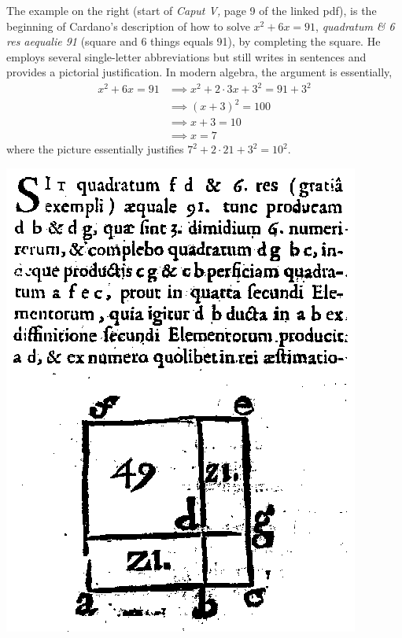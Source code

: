 \begin{minipage}[t]{0.65\linewidth}\vspace{0pt}
	The example on the right (start of \emph{Caput V,} page 9 of the linked pdf), is the beginning of Cardano's description of how to solve $x^2+6x=91$, \emph{quadratum \& 6 res aequalie 91} (square and 6 things equals 91), by completing the square. He employs several single-letter abbreviations but still writes in sentences and provides a pictorial justification. In modern algebra, the argument is essentially,
	\begin{align*}
		x^2+6x=91&\implies x^2+2\cdot 3x+3^2=91+3^2\\
		&\implies (x+3)^2=100\\
		&\implies x+3=10\\
		&\implies x=7
	\end{align*}
	where the picture  essentially justifies $7^2+2\cdot 21+3^2=10^2$.
\end{minipage}
\hfill
\begin{minipage}[t]{0.32\linewidth}\vspace{-2pt}
	\flushright\includegraphics[width=\linewidth]{cardano-quad}
\end{minipage}
\goodbreak



